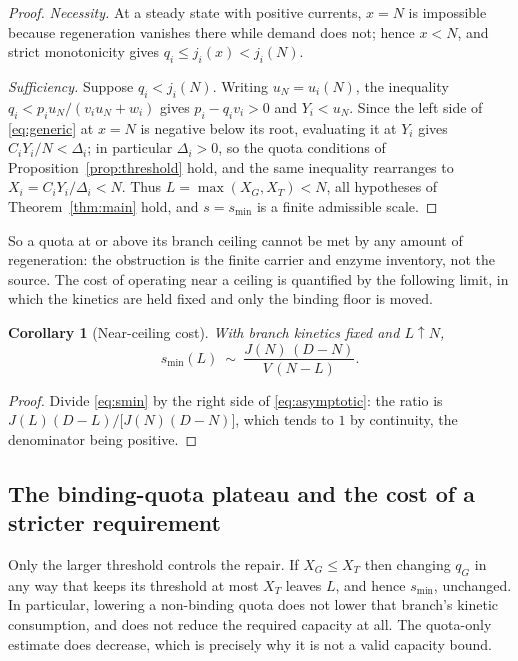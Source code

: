 \documentclass[11pt,a4paper]{article}
\theoremstyle{plain}
\newtheorem{corollary}[theorem]{Corollary}
\theoremstyle{definition}
\theoremstyle{remark}
\begin{document}
\begin{proof}
\emph{Necessity.} At a steady state with positive currents, $x=N$ is impossible
because regeneration vanishes there while demand does not; hence $x<N$, and strict
monotonicity gives $q_i\le j_i(x)<j_i(N)$.

\emph{Sufficiency.} Suppose $q_i<j_i(N)$. Writing $u_N=u_i(N)$, the inequality
$q_i<p_iu_N/(v_iu_N+w_i)$ gives $p_i-q_iv_i>0$ and $Y_i<u_N$. Since the left side
of \eqref{eq:generic} at $x=N$ is negative below its root, evaluating it at $Y_i$
gives $C_iY_i/N<\Delta_i$; in particular $\Delta_i>0$, so the quota conditions of
Proposition~\ref{prop:threshold} hold, and the same inequality rearranges to
$X_i=C_iY_i/\Delta_i<N$. Thus $L=\max(X_G,X_T)<N$, all hypotheses of
Theorem~\ref{thm:main} hold, and $s=s_{\min}$ is a finite admissible scale.
\end{proof}

So a quota at or above its branch ceiling cannot be met by any amount of
regeneration: the obstruction is the finite carrier and enzyme inventory, not the
source. The cost of operating near a ceiling is quantified by the following
limit, in which the kinetics are held fixed and only the binding floor is moved.

\begin{corollary}[Near-ceiling cost]\label{cor:asymptotic}
With branch kinetics fixed and $L\uparrow N$,
\begin{equation}\label{eq:asymptotic}
  s_{\min}(L)\ \sim\ \frac{J(N)\,(D-N)}{V\,(N-L)} .
\end{equation}
\end{corollary}

\begin{proof}
Divide \eqref{eq:smin} by the right side of \eqref{eq:asymptotic}: the ratio is
$J(L)(D-L)/\bigl[J(N)(D-N)\bigr]$, which tends to $1$ by continuity, the
denominator being positive.
\end{proof}

\subsection{The binding-quota plateau and the cost of a stricter requirement}

Only the larger threshold controls the repair. If $X_G\le X_T$ then changing $q_G$
in any way that keeps its threshold at most $X_T$ leaves $L$, and hence $s_{\min}$,
unchanged. In particular, lowering a non-binding quota does not lower that
branch's kinetic consumption, and does not reduce the required capacity at all.
The quota-only estimate does decrease, which is precisely why it is not a valid
capacity bound.
\end{document}
